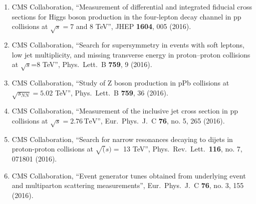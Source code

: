 \begin{enumerate}
\item CMS Collaboration, ``Measurement of differential and integrated fiducial cross sections for Higgs boson production in the four-lepton decay channel in pp collisions at $ \sqrt{s}=7 $ and 8 TeV'', JHEP {\bf 1604}, 005 (2016).

\item CMS Collaboration, ``Search for supersymmetry in events with soft leptons, low jet multiplicity, and missing transverse energy in proton–proton collisions at $\sqrt{s}$=8 TeV'', Phys.\ Lett.\ B {\bf 759}, 9 (2016).

\item CMS Collaboration, ``Study of Z boson production in pPb collisions at $\sqrt {s_{NN}} = 5.02$ TeV'', Phys.\ Lett.\ B {\bf 759}, 36 (2016).

\item CMS Collaboration, ``Measurement of the inclusive jet cross section in pp collisions at $\sqrt{s} = 2.76\,\text {TeV}$'', Eur.\ Phys.\ J.\ C {\bf 76}, no. 5, 265 (2016).

\item CMS Collaboration, ``Search for narrow resonances decaying to dijets in proton-proton collisions at $\sqrt(s) =$ 13 TeV'', Phys.\ Rev.\ Lett.\  {\bf 116}, no. 7, 071801 (2016).

\item CMS Collaboration, ``Event generator tunes obtained from underlying event and multiparton scattering measurements'', Eur.\ Phys.\ J.\ C {\bf 76}, no. 3, 155 (2016).


\end{enumerate}
